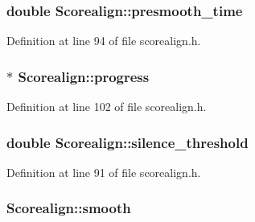 \subsubsection[{\texorpdfstring{presmooth\+\_\+time}{presmooth_time}}]{\setlength{\rightskip}{0pt plus 5cm}double Scorealign\+::presmooth\+\_\+time}\hypertarget{class_scorealign_abf993742219359f789e1695b546cda87}{}\label{class_scorealign_abf993742219359f789e1695b546cda87}


Definition at line 94 of file scorealign.\+h.

\subsubsection[{\texorpdfstring{progress}{progress}}]{$\ast$ Scorealign\+::progress}\hypertarget{class_scorealign_a3fa5103411223026f9785f896c8f9572}{}\label{class_scorealign_a3fa5103411223026f9785f896c8f9572}


Definition at line 102 of file scorealign.\+h.

\subsubsection[{\texorpdfstring{silence\+\_\+threshold}{silence_threshold}}]{\setlength{\rightskip}{0pt plus 5cm}double Scorealign\+::silence\+\_\+threshold}\hypertarget{class_scorealign_ac8da1d180b5d33a6f4bda884acaa2a23}{}\label{class_scorealign_ac8da1d180b5d33a6f4bda884acaa2a23}


Definition at line 91 of file scorealign.\+h.

\subsubsection[{\texorpdfstring{smooth}{smooth}}]{ Scorealign\+::smooth}\hypertarget{class_scorealign_ad049e8da9635fa284dadb6d17cd82bf2}{}\label{class_scorealign_ad049e8da9635fa284dadb6d17cd82bf2}


